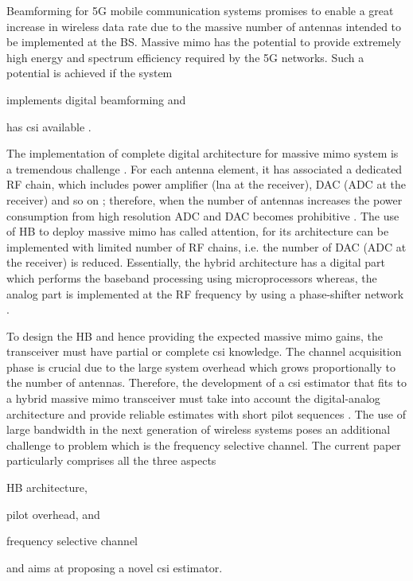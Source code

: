 \documentclass[conference]{IEEEtran}
\begin{document}
Beamforming for 5G mobile communication systems promises to enable a great
increase in wireless data rate due to the massive number of antennas intended to
be implemented at the \gls{BS}. Massive \gls{mimo} has the potential to provide
extremely high energy and spectrum efficiency required by the 5G
networks\cite{Larsson:2014}.
Such a potential is achieved if the system
\begin{inparaenum}[(i)]
\item implements digital beamforming and
\item has \gls{csi} available \cite{Gao:2016a}.
\end{inparaenum}

The implementation of complete digital architecture for massive \gls{mimo}
system is a tremendous challenge \cite{Alkhateeb:2014}. For each antenna element, it has associated a
dedicated \gls{RF} chain, which includes power amplifier (\gls{lna} at the
receiver), \gls{DAC} (\gls{ADC} at the receiver) and so on
\cite{Venkateswaran:2008,Alkhateeb:2014}; therefore, when the number of antennas
increases the power consumption from high resolution \gls{ADC} and \gls{DAC}
becomes prohibitive \cite{Alkhateeb:2014,Alkhateeb:2016a}. The use of \gls{HB}
to deploy massive \gls{mimo} has called attention, for its architecture can be
implemented with limited number of \gls{RF} chains, i.e. the number of \gls{DAC}
(\gls{ADC} at the receiver) is reduced. Essentially, the hybrid architecture has
a digital part which performs the baseband processing using microprocessors
whereas, the analog part is implemented at the \gls{RF} frequency by using a
phase-shifter network \cite{Heath:2016,Alkhateeb:2014,Alkhateeb:2016a}.

To design the \gls{HB} and hence providing the expected massive \gls{mimo} gains, the transceiver must have partial or complete \gls{csi}
knowledge. The channel acquisition phase is crucial due to
the large system overhead which grows proportionally
to the number of antennas. Therefore, the development of a
\gls{csi} estimator that fits to a hybrid massive \gls{mimo} transceiver must
take into account the digital-analog architecture and provide reliable estimates
with short pilot sequences \cite{Alkhateeb:2014,Alkhateeb:2016a}. The use of large bandwidth in the next
generation of wireless systems poses an additional challenge to problem which is the
frequency selective channel. The current paper particularly comprises all the three aspects
\begin{inparaenum}[(i)]
\item \gls{HB} architecture,
\item pilot overhead, and
\item frequency selective channel
\end{inparaenum}
and aims at proposing a novel \gls{csi} estimator.
\end{document}
